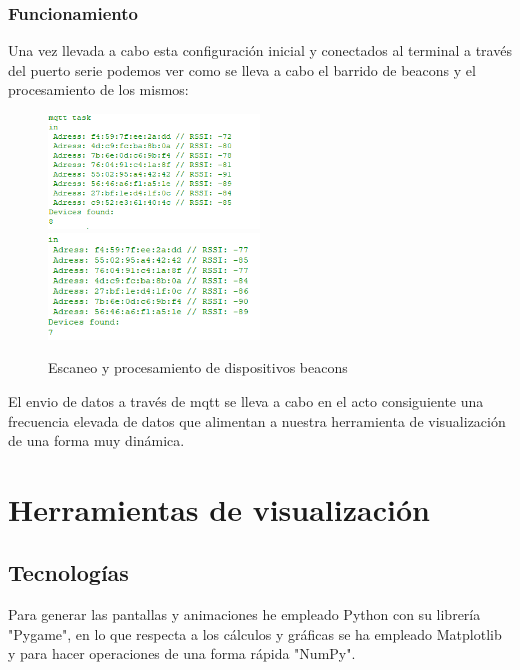 \documentclass[a4paper ,12pt, onecolumn]{article}
\begin{document}
        \subsubsection{Funcionamiento}
            Una vez llevada a cabo esta configuración inicial y conectados al terminal a través del puerto serie podemos ver como se lleva a cabo el barrido 
            de beacons y el procesamiento de los mismos:
            \begin{center}
                \begin{figure}[]
                    \centering
                    \includegraphics[width=0.5\textwidth]{../../Memmory/images/s_scanning_1.PNG}
                    \includegraphics[width=0.5\textwidth]{../../Memmory/images/s_scanning_2.PNG}
                    \caption{Escaneo y procesamiento de dispositivos beacons}
                    \label{fig:mesh11}
                \end{figure}
            \end{center}
            El envio de datos a través de mqtt se lleva a cabo en el acto consiguiente una frecuencia elevada de datos que alimentan a nuestra herramienta 
            de visualización de una forma muy dinámica.
            \section{Herramientas de visualización}
    \subsection{Tecnologías}
        Para generar las pantallas y animaciones he empleado Python con su librería "Pygame", en lo que respecta a los cálculos 
        y gráficas se ha empleado Matplotlib y para hacer operaciones de una forma rápida "NumPy".    
\end{document}
